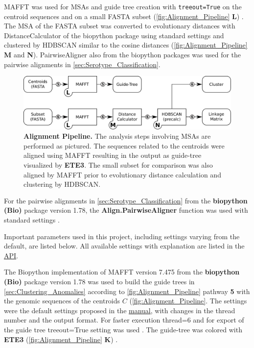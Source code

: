 MAFFT was used for \glspl{MSA} and guide tree creation with \texttt{treeout=True} on the centroid sequences and on a small FASTA subset (\autoref{fig:Alignment_Pipeline} \textsf{\textbf{L}}) \autocite{katoh_mafft_2013}. The \gls{MSA} of the FASTA subset was converted to evolutionary distances with DistanceCalculator of the biopython package using standard settings and clustered by \gls{HDBSCAN} similar to the cosine distances (\autoref{fig:Alignment_Pipeline} \textsf{\textbf{M}} and \textsf{\textbf{N}}). PairwiseAligner also from the biopython packages was used for the pairwise alignments in \autoref{sec:Serotype_Classification}.

\begin{figure}[!hbt]
    \centering
    \includegraphics[width=\textwidth]{Graphics/Alignment.pdf}
    \caption[Alignment Pipeline]{\textbf{Alignment Pipeline.} The analysis steps involving \glspl{MSA} are performed as pictured. The sequences related to the centroids were aligned using MAFFT resulting in the output as guide-tree visualized by \textbf{ETE3}. The small subset for comparison was also aligned by MAFFT prior to evolutionary distance calculation and clustering by \gls{HDBSCAN}.}
    \label{fig:Alignment_Pipeline}
\end{figure}






For the pairwise alignments in \autoref{sec:Serotype_Classification} from the \textbf{biopython (Bio)} package version 1.78, the \textbf{Align.PairwiseAligner} function was used with standard settings \autocite{cock_biopython_2009}. 

Important parameters used in this project, including settings varying from the default, are listed below. All available settings with explanation are listed in the \href{https://biopython.org/docs/1.75/api/Bio.Align.html}{API}.

The Biopython implementation of MAFFT version 7.475 from the \textbf{biopython (Bio)} package version 1.78 was used to build the guide trees in \autoref{sec:Clustering_Anomalies} according to \autoref{fig:Alignment_Pipeline} pathway \textsf{\textbf{5}} with the genomic sequences of the centroids $C$ \autocite{katoh_mafft_2013, cock_biopython_2009} (\autoref{fig:Alignment_Pipeline}. The settings were the default settings proposed in the \href{https://mafft.cbrc.jp/alignment/software/}{manual}, with changes in the thread number and the output format. For faster execution \colorbox{backcolour}{thread=6} and for export of the guide tree \colorbox{backcolour}{treeout=True} setting was used \autocite{katoh_mafft_2013, cock_biopython_2009}. The guide-tree was colored with \textbf{ETE3} (\autoref{fig:Alignment_Pipeline} \textsf{\textbf{K}}) \autocite{huerta-cepas_ete_2016}.

